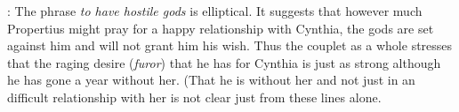 
: The phrase \textit{to have hostile gods} is elliptical.  It suggests that however much Propertius might pray for a happy relationship with Cynthia, the gods are set against him and will not grant him his wish.  Thus the couplet as a whole stresses that the raging desire (\textit{furor}) that he has for Cynthia is just as strong although he has gone a year without her.  (That he is without her and not just in an difficult relationship with her is not clear just from these lines alone.

